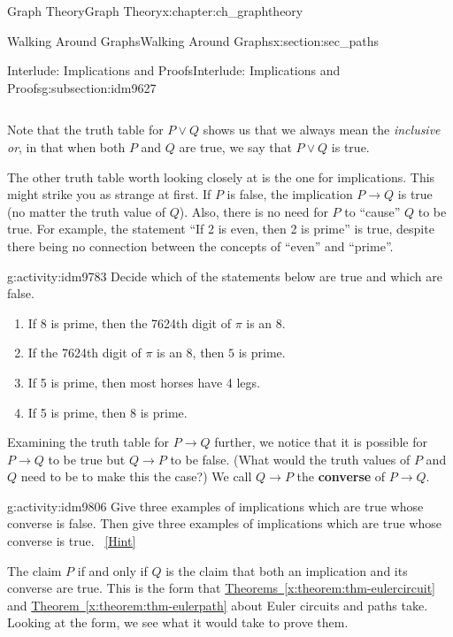 \documentclass[oneside,10pt,]{book}
\newcommand{\terminology}[1]{\textbf{#1}}
\numberwithin{equation}{chapter}
\def\imp{\rightarrow}
\begin{document}
\begin{chapterptx}{Graph Theory}{}{Graph Theory}{}{}{x:chapter:ch_graphtheory}
\begin{sectionptx}{Walking Around Graphs}{}{Walking Around Graphs}{}{}{x:section:sec_paths}
\begin{subsectionptx}{Interlude: Implications and Proofs}{}{Interlude: Implications and Proofs}{}{}{g:subsection:idm9627}
\begin{sidebyside}{4}{0.025}{0.025}{0.05}
\begin{sbspanel}{0.2}
{\begin{tabular}{cBc}
\end{tabular}
\par}
\end{sbspanel}%
\end{sidebyside}%
\par
Note that the truth table for \(P \vee Q\) shows us that we always mean the \emph{inclusive or}, in that when both \(P\) and \(Q\) are true, we say that \(P \vee Q\) is true.%
\par
The other truth table worth looking closely at is the one for implications.  This might strike you as strange at first.  If \(P\) is false, the implication \(P \imp Q\) is true (no matter the truth value of \(Q\)).  Also, there is no need for \(P\) to ``cause'' \(Q\) to be true.  For example, the statement ``If 2 is even, then 2 is prime'' is true, despite there being no connection between the concepts of ``even'' and ``prime''.%
\begin{activity}{}{g:activity:idm9783}%
Decide which of the statements below are true and which are false.%
\begin{enumerate}[font=\bfseries,label=(\alph*),ref=\alph*]
\item{}If 8 is prime, then the 7624th digit of \(\pi\) is an 8.%
\item{}If the 7624th digit of \(\pi\) is an 8, then \(5\) is prime.%
\item{}If 5 is prime, then most horses have 4 legs.%
\item{}If 5 is prime, then 8 is prime.%
\end{enumerate}
\end{activity}
Examining the truth table for \(P \imp Q\) further, we notice that it is possible for \(P \imp Q\) to be true but \(Q \imp P\) to be false. (What would the truth values of \(P\) and \(Q\) need to be to make this the case?) We call \(Q \imp P\) the \terminology{converse} of \(P \imp Q\).%
\begin{activity}{}{g:activity:idm9806}%
Give three examples of implications which are true whose converse is false.  Then give three examples of implications which are true whose converse is true.%
\qquad~\hfill{\tiny\hyperlink{g:hint:idm9809-back}{[Hint]}}\end{activity}
The claim \(P\) if and only if \(Q\) is the claim that both an implication and its converse are true.  This is the form that \hyperref[x:theorem:thm-eulercircuit]{Theorems~\ref{x:theorem:thm-eulercircuit}} and \hyperref[x:theorem:thm-eulerpath]{Theorem~\ref{x:theorem:thm-eulerpath}} about Euler circuits and paths take.  Looking at the form, we see what it would take to prove them.%

\end{subsectionptx}
\end{sectionptx}
\end{chapterptx}
\end{document}
